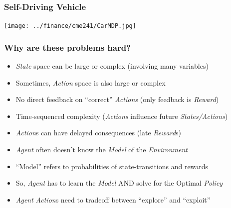 \documentclass[handout]{beamer}
\begin{document}
\begin{frame}
\frametitle{Self-Driving Vehicle}
\texttt{[image: ../finance/cme241/CarMDP.jpg]}
\end{frame}

\begin{frame}
\frametitle{Why are these problems hard?}
\pause
\begin{itemize}[<+->]
\item {\em State} space can be large or complex (involving many variables)
\item Sometimes, {\em Action} space is also large or complex
\item No direct feedback on ``correct'' {\em Actions} (only feedback is {\em Reward})
\item Time-sequenced complexity ({\em Actions} influence future {\em States/Actions})
\item {\em Action}s can have delayed consequences (late {\em Reward}s)
\item {\em Agent} often doesn't know the {\em Model} of the {\em Environment}
\item ``Model'' refers to probabilities of state-transitions and rewards
\item So, {\em Agent} has to learn the {\em Model} AND solve for the Optimal {\em Policy}
\item {\em Agent} {\em Action}s need to tradeoff between ``explore'' and ``exploit''
\end{itemize}
\end{frame}
\end{document}
